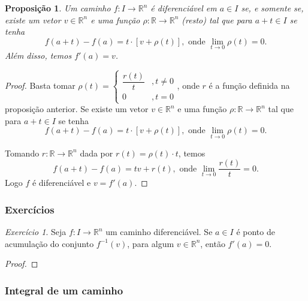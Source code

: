 \documentclass{article}
\newtheorem{prop}{Proposição}[section]
\theoremstyle{theorem}
\theoremstyle{lemma}
\theoremstyle{definition}
\theoremstyle{remark}
\newtheorem{exercicio}{Exercício}[subsection]
\begin{document}
   \begin{prop}
	   Um caminho \( f:I\to \mathbb{R}^n \) é diferenciável em \(a\in I\) se, e somente se, existe um vetor \(v\in \mathbb{R}^n\) e uma função $\rho : \mathbb{R} \to \mathbb{R}^n$ (resto) tal que para \(a+t\in I\) se tenha \[ f(a+t) - f(a) = t\cdot\left[ v + \rho(t)\right], \text{ onde } \lim_{t \to 0} \rho(t) = 0.\]
	   Além disso, temos \(f'(a) = v\).
   \end{prop}
   \begin{proof}
	   Basta tomar \(\rho(t) = \begin{cases} \dfrac{r(t)}{t} &, t\neq 0 \\ 0 &, t=0 \end{cases} \), onde $r$ é a função definida  na proposição anterior.
Se existe um vetor \(v\in \mathbb{R}^n\) e uma função $\rho : \mathbb{R} \to \mathbb{R}^n$  tal que para \(a+t\in I\) se tenha \[ f(a+t) - f(a) = t\cdot\left[ v + \rho(t)\right], \text{ onde } \lim_{t \to 0} \rho(t) = 0.\]

	   Tomando \( r: \mathbb{R} \to \mathbb{R}^n \) dada por \( r(t) = \rho(t)\cdot t \), temos \[ f(a+t) - f(a) = t v + r(t), \text{ onde } \lim_{t \to 0} \dfrac{r(t)}{t} = 0.\] Logo \(f\) é diferenciável e \( v = f'(a) \).
   \end{proof}
   \subsubsection{Exercícios}
   \begin{exercicio}
	   Seja \(f:I\to \mathbb{R}^n\) um caminho diferenciável. Se \(a\in I\) é ponto de acumulação do conjunto \(f^{-1}(v)\), para algum \(v\in \mathbb{R}^n\), então $f'(a) = 0$.
   \end{exercicio}
   \begin{proof}

   \end{proof}
	   
   \subsubsection{ Integral de um caminho}
\end{document}
